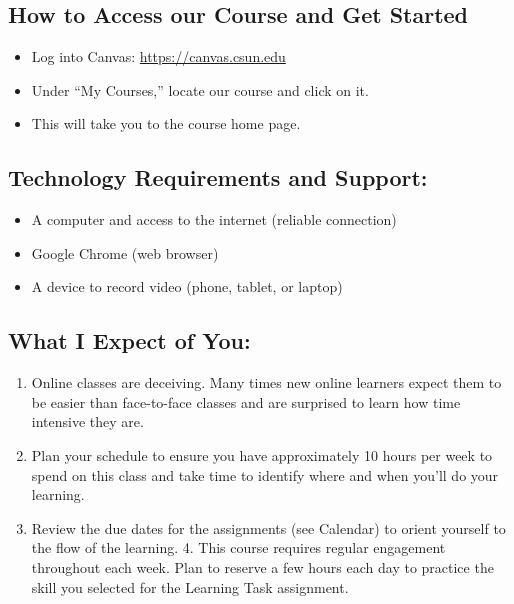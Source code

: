 \documentclass[11pt,]{article}
\providecommand{\tightlist}{%
  \setlength{\itemsep}{0pt}\setlength{\parskip}{0pt}}
\begin{document}
\hypertarget{how-to-access-our-course-and-get-started}{%
\subsection{How to Access our Course and Get
Started}\label{how-to-access-our-course-and-get-started}}

\begin{itemize}
\tightlist
\item
  Log into Canvas: \url{https://canvas.csun.edu}
\item
  Under ``My Courses,'' locate our course and click on it.
\item
  This will take you to the course home page.
\end{itemize}

\hypertarget{technology-requirements-and-support}{%
\subsection{Technology Requirements and
Support:}\label{technology-requirements-and-support}}

\begin{itemize}
\tightlist
\item
  A computer and access to the internet (reliable connection)
\item
  Google Chrome (web browser)
\item
  A device to record video (phone, tablet, or laptop)
\end{itemize}

\hypertarget{what-i-expect-of-you}{%
\subsection{What I Expect of You:}\label{what-i-expect-of-you}}

\begin{enumerate}
\def\labelenumi{\arabic{enumi}.}
\tightlist
\item
  Online classes are deceiving. Many times new online learners expect
  them to be easier than face-to-face classes and are surprised to learn
  how time intensive they are.
\item
  Plan your schedule to ensure you have approximately 10 hours per week
  to spend on this class and take time to identify where and when you'll
  do your learning.
\item
  Review the due dates for the assignments (see Calendar) to orient
  yourself to the flow of the learning. 4. This course requires regular
  engagement throughout each week. Plan to reserve a few hours each day
  to practice the skill you selected for the Learning Task assignment.
\end{enumerate}
\end{document}
